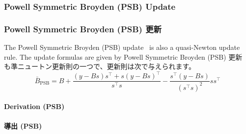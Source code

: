 \documentclass[0_main]{subfiles}
\begin{document}
\ifEn
    \subsubsection{Powell Symmetric Broyden (PSB) Update}
\else
    \subsubsection{Powell Symmetric Broyden (PSB) 更新}
\fi

\ifEn
    The Powell Symmetric Broyden (PSB) update~\citep{m.j.d.powellNewAlgorithmUnconstrained1970,doi:10.1137/1.9781611971200,haeltermanAnalyticalStudyLeast2009} is also a quasi-Newton update rule. The update formulas are given by
\else
    Powell Symmetric Broyden (PSB) 更新~\citep{m.j.d.powellNewAlgorithmUnconstrained1970,doi:10.1137/1.9781611971200,haeltermanAnalyticalStudyLeast2009} も準ニュートン更新則の一つで、更新則は次で与えられます。
\fi
\begin{equation*}
    \bar{B}_{\mathrm{PSB}} = B + \frac{(y - B s) s^\top + s (y - B s)^\top}{s^\top s} - \frac{s^\top (y - B s)}{(s^\top s)^2} s s^\top
\end{equation*}

\ifEn
    \paragraph{Derivation (PSB)}
\else
    \paragraph{導出 (PSB)}
\fi
\end{document}
